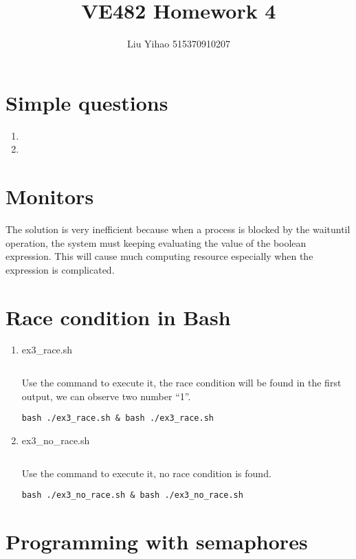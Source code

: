 \documentclass{article}
\title{VE482 Homework 4}
\author{Liu Yihao 515370910207}
\date{}
\begin{document}
\maketitle

\section{Simple questions}
\begin{enumerate}
\item
\item
\end{enumerate}

\section{Monitors}
The solution is very inefficient because when a process is blocked by the waituntil operation, the system must keeping evaluating the value of the boolean expression. This will cause much computing resource especially when the expression is complicated.

\section{Race condition in Bash}
\begin{enumerate}
\item
ex3\_race.sh
\inputminted{shell}{ex3_race.sh}
Use the command to execute it, the race condition will be found in the first output, we can observe two number ``1''.
\begin{verbatim}
bash ./ex3_race.sh & bash ./ex3_race.sh
\end{verbatim}
\item
ex3\_no\_race.sh
\inputminted{shell}{ex3_no_race.sh}
Use the command to execute it, no race condition is found.
\begin{verbatim}
bash ./ex3_no_race.sh & bash ./ex3_no_race.sh
\end{verbatim}
\end{enumerate}

\section{Programming with semaphores}
\inputminted{c}{ex4.c}
\end{document}
